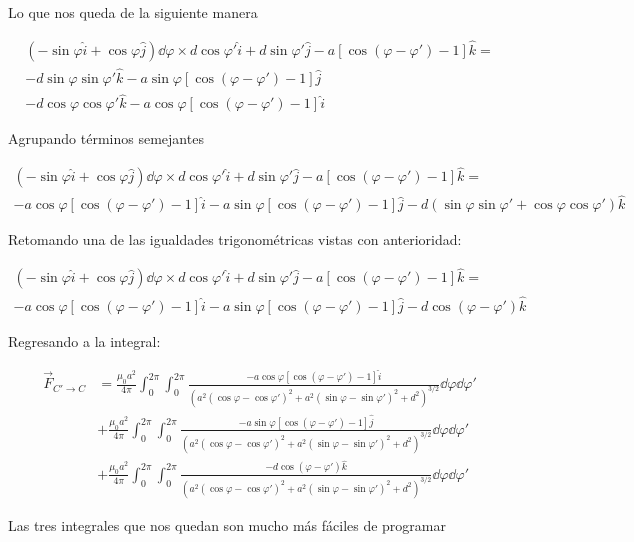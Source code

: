 \documentclass[11pt]{report}
\theoremstyle{plain}
\theoremstyle{definition}
\begin{document}
	Lo que nos queda de la siguiente manera
	
	\begin{align*}%
		\left(-\sin\varphi\hat{i} + \cos\varphi\hat{j}\right)\dd{\varphi} \times d\cos\varphi'\hat{i}+d\sin\varphi'\hat{j}-a\left[\cos{(\varphi-\varphi')}-1\right]\hat{k} = \\
		- d\sin\varphi\sin\varphi'\hat{k} - a\sin\varphi\left[\cos{(\varphi-\varphi')}-1\right]\hat{j}\\
		-d\cos\varphi\cos\varphi'\hat{k} - a\cos\varphi\left[\cos{(\varphi-\varphi')}-1\right]\hat{i}
	\end{align*}
	
	Agrupando términos semejantes
	
	\begin{align*}%
		\left(-\sin\varphi\hat{i} + \cos\varphi\hat{j}\right)\dd{\varphi} \times d\cos\varphi'\hat{i}+d\sin\varphi'\hat{j}-a\left[\cos{(\varphi-\varphi')}-1\right]\hat{k} = \\
		- a\cos\varphi\left[\cos{(\varphi-\varphi')}-1\right]\hat{i} - a\sin\varphi\left[\cos{(\varphi-\varphi')}-1\right]\hat{j}
		- d\left( \sin\varphi\sin\varphi'+\cos\varphi\cos\varphi'\right)\hat{k} 
	\end{align*}
	
	Retomando una de las igualdades trigonométricas vistas con anterioridad: 
	
	\begin{align*}%
		\left(-\sin\varphi\hat{i} + \cos\varphi\hat{j}\right)\dd{\varphi} \times d\cos\varphi'\hat{i}+d\sin\varphi'\hat{j}-a\left[\cos{(\varphi-\varphi')}-1\right]\hat{k} = \\
		- a\cos\varphi\left[\cos{(\varphi-\varphi')}-1\right]\hat{i} - a\sin\varphi\left[\cos{(\varphi-\varphi')}-1\right]\hat{j}
		- d\cos{(\varphi - \varphi')}\hat{k} 
	\end{align*}
	
	Regresando a la integral:
	
	\begin{align*}%
		\vec{F}_{C'\rightarrow C} &= \frac{\mu_0a^2}{4\pi}\int_0^{2\pi}\int_0^{2\pi}\frac{ - a\cos\varphi\left[\cos{(\varphi-\varphi')}-1\right]\hat{i} }{\left(a^2(\cos\varphi-\cos\varphi')^2 + a^2(\sin\varphi-\sin\varphi')^2 + d^2\right)^{3/2}}\dd{\varphi}\dd{\varphi'}\\
		&+ \frac{\mu_0a^2}{4\pi}\int_0^{2\pi}\int_0^{2\pi}\frac{ - a\sin\varphi\left[\cos{(\varphi-\varphi')}-1\right]\hat{j} }{\left(a^2(\cos\varphi-\cos\varphi')^2 + a^2(\sin\varphi-\sin\varphi')^2 + d^2\right)^{3/2}}\dd{\varphi}\dd{\varphi'}\\
		&+ \frac{\mu_0a^2}{4\pi}\int_0^{2\pi}\int_0^{2\pi}\frac{ - d\cos{(\varphi - \varphi')}\hat{k}  }{\left(a^2(\cos\varphi-\cos\varphi')^2 + a^2(\sin\varphi-\sin\varphi')^2 + d^2\right)^{3/2}}\dd{\varphi}\dd{\varphi'}
	\end{align*}
	
	Las tres integrales que nos quedan son mucho más fáciles de programar
\end{document}
